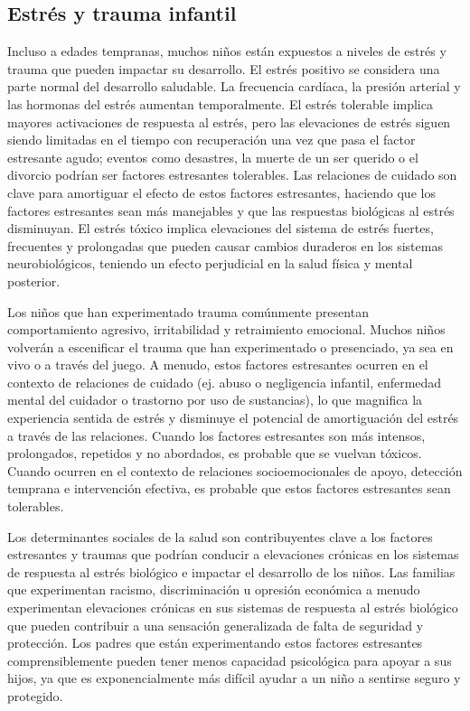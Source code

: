 \documentclass[11pt,letterpaper]{report}
\begin{document}
\subsection{Estrés y trauma infantil}
Incluso a edades tempranas, muchos niños están expuestos a niveles de estrés y
trauma que pueden impactar su desarrollo. El estrés positivo se considera una
parte normal del desarrollo saludable. La frecuencia cardíaca, la presión
arterial y las hormonas del estrés aumentan temporalmente. El estrés tolerable
implica mayores activaciones de respuesta al estrés, pero las elevaciones de
estrés siguen siendo limitadas en el tiempo con recuperación una vez que pasa
el factor estresante agudo; eventos como desastres, la muerte de un ser
querido o el divorcio podrían ser factores estresantes tolerables. Las
relaciones de cuidado son clave para amortiguar el efecto de estos factores
estresantes, haciendo que los factores estresantes sean más manejables y que
las respuestas biológicas al estrés disminuyan. El estrés tóxico implica
elevaciones del sistema de estrés fuertes, frecuentes y prolongadas que pueden
causar cambios duraderos en los sistemas neurobiológicos, teniendo un efecto
perjudicial en la salud física y mental posterior. \cite{Feldman3}

Los niños que han experimentado trauma comúnmente presentan comportamiento
agresivo, irritabilidad y retraimiento emocional. Muchos niños volverán a
escenificar el trauma que han experimentado o presenciado, ya sea en vivo o a
través del juego. A menudo, estos factores estresantes ocurren en el contexto
de relaciones de cuidado (ej. abuso o negligencia infantil, enfermedad mental
del cuidador o trastorno por uso de sustancias), lo que magnifica la
experiencia sentida de estrés y disminuye el potencial de amortiguación del
estrés a través de las relaciones. Cuando los factores estresantes son más
intensos, prolongados, repetidos y no abordados, es probable que se vuelvan
tóxicos. Cuando ocurren en el contexto de relaciones socioemocionales de apoyo,
detección temprana e intervención efectiva, es probable que estos factores
estresantes sean tolerables. \cite{Feldman3}

Los determinantes sociales de la salud son contribuyentes clave a los factores
estresantes y traumas que podrían conducir a elevaciones crónicas en los
sistemas de respuesta al estrés biológico e impactar el desarrollo de los
niños. Las familias que experimentan racismo, discriminación u opresión
económica a menudo experimentan elevaciones crónicas en sus sistemas de
respuesta al estrés biológico que pueden contribuir a una sensación
generalizada de falta de seguridad y protección. Los padres que están
experimentando estos factores estresantes comprensiblemente pueden tener menos
capacidad psicológica para apoyar a sus hijos, ya que es exponencialmente más
difícil ayudar a un niño a sentirse seguro y protegido. \cite{Feldman3}
\end{document}
